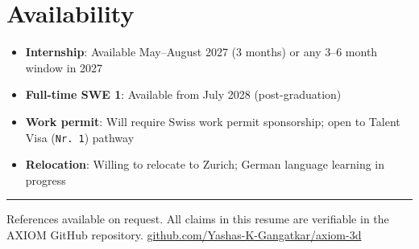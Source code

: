\documentclass[11pt,a4paper]{article}
\begin{document}
\section*{Availability}

\begin{itemize}
\item \textbf{Internship}: Available May--August 2027 (3 months) or any 3--6 month window in 2027
\item \textbf{Full-time SWE 1}: Available from July 2028 (post-graduation)
\item \textbf{Work permit}: Will require Swiss work permit sponsorship; open to Talent Visa (\texttt{Nr. 1}) pathway
\item \textbf{Relocation}: Willing to relocate to Zurich; German language learning in progress
\end{itemize}

\vspace{6pt}
\hrule
\vspace{4pt}
{\footnotesize References available on request. All claims in this resume are verifiable in the AXIOM GitHub repository. \href{https://github.com/Yashas-K-Gangatkar/axiom-3d}{github.com/Yashas-K-Gangatkar/axiom-3d}}
\end{document}
